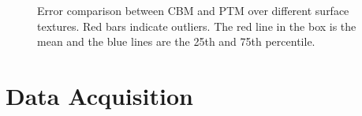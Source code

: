 \begin{figure}[t]
\centering
{}
\label{fig:plot}
\caption{Error comparison between CBM and PTM over
different surface textures. Red bars indicate outliers. The red line in the box
is the mean and the blue lines are the 25th and 75th percentile.}
\end{figure}



\section{Data Acquisition}

